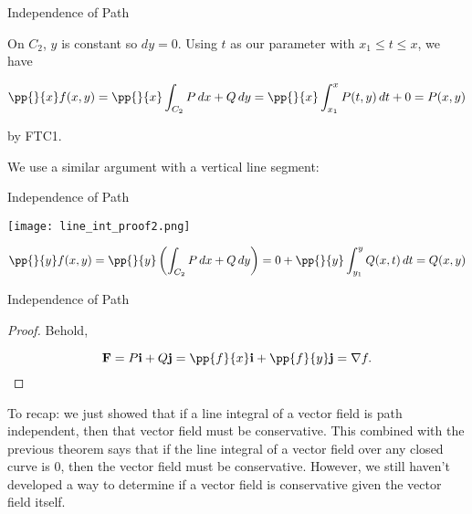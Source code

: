 \documentclass[11pt,english,
handout
]{beamer}
\begin{document}
\begin{frame}{Independence of Path}
\small

\begin{proofs}
On $C_2$, $y$ is constant so $dy=0$. Using $t$ as our parameter with $x_1\leq t\leq x$, we have

\[
\pp{}{x}f(x,y)=\pp{}{x}\int_{C_2}P\,dx+Q\,dy=\pp{}{x}\int_{x_1}^xP(t,y)\,dt+0=P(x,y)
\]
\lspace

by FTC1.\pause

\lspace
We use a similar argument with a vertical line segment:
\end{proofs}
\end{frame}











\begin{frame}[t]{Independence of Path}
\small

\begin{proofs}
\begin{center}
\texttt{[image: line\_int\_proof2.png]}
\end{center}
\[
\pp{}{y}f(x,y)=\pp{}{y}\left(\int_{C_2}P\,dx+Q\,dy\right)=0+\pp{}{y}\int_{y_1}^yQ(x,t)\,dt=Q(x,y)
\]
\end{proofs}
\end{frame}







\begin{frame}{Independence of Path}
\small

\begin{proof}

Behold,

\[
\mathbf{F}=P\mathbf{i}+Q\mathbf{j}=\pp{f}{x}\mathbf{i}+\pp{f}{y}\mathbf{j}=\nabla f.
\]
\end{proof}\pause

\lspace
To recap: we just showed that if a line integral of a vector field is path independent, then that vector field must be conservative. This combined with the previous theorem says that if the line integral of a vector field over any closed curve is 0, then the vector field must be conservative. However, we still haven't developed a way to determine if a vector field is conservative given the vector field itself. 
\end{frame}
\end{document}
